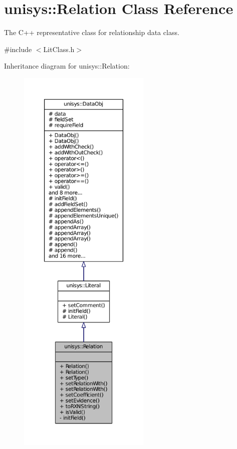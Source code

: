 \hypertarget{classunisys_1_1Relation}{\section{unisys\-:\-:Relation Class Reference}
\label{classunisys_1_1Relation}
}


The C++ representative class for relationship data class.  




{\ttfamily \#include $<$Lit\-Class.\-h$>$}



Inheritance diagram for unisys\-:\-:Relation\-:
\nopagebreak
\begin{figure}[H]
\begin{center}
\leavevmode
\includegraphics[height=550pt]{classunisys_1_1Relation__inherit__graph}
\end{center}
\end{figure}


